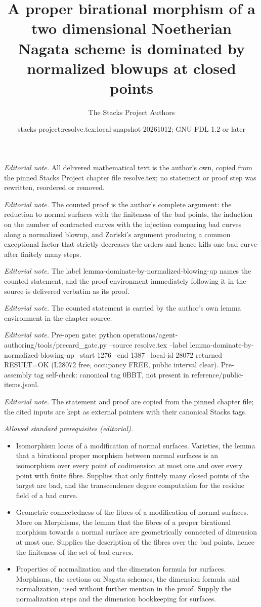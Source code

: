 \documentclass[10pt,a4paper]{amsart}
\title{A proper birational morphism of a two dimensional Noetherian Nagata scheme is dominated by normalized blowups at closed points}
\author{The Stacks Project Authors}
\date{stacks-project:resolve.tex:local-snapshot-20261012; GNU FDL 1.2 or later}
\theoremstyle{plain}
\theoremstyle{definition}
\theoremstyle{remark}
\numberwithin{equation}{subsection}
\begin{document}
\maketitle
\noindent\textit{Editorial note.} All delivered mathematical text is the author's own, copied from the pinned Stacks Project chapter file resolve.tex; no statement or proof step was rewritten, reordered or removed.\par\medskip
\noindent\textit{Editorial note.} The counted proof is the author's complete argument: the reduction to normal surfaces with the finiteness of the bad points, the induction on the number of contracted curves with the injection comparing bad curves along a normalized blowup, and Zariski's argument producing a common exceptional factor that strictly decreases the orders and hence kills one bad curve after finitely many steps.\par\medskip
\noindent\textit{Editorial note.} The label lemma-dominate-by-normalized-blowing-up names the counted statement, and the proof environment immediately following it in the source is delivered verbatim as its proof.\par\medskip
\noindent\textit{Editorial note.} The counted statement is carried by the author's own lemma environment in the chapter source.\par\medskip
\noindent\textit{Editorial note.} Pre-open gate: python operations/agent-authoring/tools/precard\_gate.py --source resolve.tex --label lemma-dominate-by-normalized-blowing-up --start 1276 --end 1387 --local-id 28072 returned RESULT=OK (L28072 free, occupancy FREE, public interval clear). Pre-assembly tag self-check: canonical tag 0BBT, not present in reference/public-items.jsonl.\par\medskip
\noindent\textit{Editorial note.} The statement and proof are copied from the pinned chapter file; the cited inputs are kept as external pointers with their canonical Stacks tags.\par\medskip
\noindent\textit{Allowed standard prerequisites (editorial).}\begin{itemize}
\item Isomorphism locus of a modification of normal surfaces. Varieties, the lemma that a birational proper morphism between normal surfaces is an isomorphism over every point of codimension at most one and over every point with finite fibre. Supplies that only finitely many closed points of the target are bad, and the transcendence degree computation for the residue field of a bad curve.
\item Geometric connectedness of the fibres of a modification of normal surfaces. More on Morphisms, the lemma that the fibres of a proper birational morphism towards a normal surface are geometrically connected of dimension at most one. Supplies the description of the fibres over the bad points, hence the finiteness of the set of bad curves.
\item Properties of normalization and the dimension formula for surfaces. Morphisms, the sections on Nagata schemes, the dimension formula and normalization, used without further mention in the proof. Supply the normalization steps and the dimension bookkeeping for surfaces.
\end{itemize}\medskip
\end{document}

